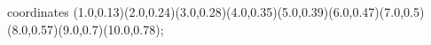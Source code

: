 					coordinates { (1.0,0.13)(2.0,0.24)(3.0,0.28)(4.0,0.35)(5.0,0.39)(6.0,0.47)(7.0,0.5)(8.0,0.57)(9.0,0.7)(10.0,0.78)};